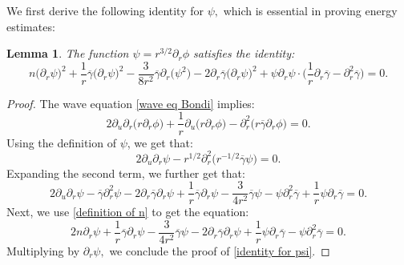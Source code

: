 \documentclass[11pt]{article}
\newtheorem{lemma}{Lemma}[section]
\numberwithin{equation}{section}
\begin{document}
We first derive the following identity for $\psi,$ which is essential in proving energy estimates:
\begin{lemma}
    The function $\psi=r^{3/2}\partial_r\phi$ satisfies the identity:
    \begin{equation}\label{identity for psi}
        n\big(\partial_r\psi\big)^2+\frac{1}{r}\overline{\gamma}\big(\partial_r\psi\big)^2-\frac{3}{8r^2}\overline{\gamma}\partial_r\big(\psi^2\big)-2\partial_r\overline{\gamma}\big(\partial_r\psi\big)^2+\psi\partial_r\psi\cdot\bigg(\frac{1}{r}\partial_r\overline{\gamma}-\partial_r^2\overline{\gamma}\bigg)=0.
    \end{equation}
\end{lemma}
\begin{proof}
    The wave equation \eqref{wave eq Bondi} implies:
\[2\partial_u\partial_r\big(r\partial_r\phi\big)+\frac{1}{r}\partial_u\big(r\partial_r\phi\big)-\partial_r^2\big(r\overline{\gamma}\partial_r\phi\big)=0.\]
Using the definition of $\psi$, we get that:
\[2\partial_u\partial_r\psi-r^{1/2}\partial_r^2\big(r^{-1/2}\overline{\gamma}\psi\big)=0.\]
Expanding the second term, we further get that:
\[2\partial_u\partial_r\psi-\overline{\gamma}\partial_r^2\psi-2\partial_r\overline{\gamma}\partial_r\psi+\frac{1}{r}\overline{\gamma}\partial_r\psi-\frac{3}{4r^2}\overline{\gamma}\psi-\psi\partial_r^2\overline{\gamma}+\frac{1}{r}\psi\partial_r\overline{\gamma}=0.\]
Next, we use \eqref{definition of n} to get the equation:
\[2n\partial_r\psi+\frac{1}{r}\overline{\gamma}\partial_r\psi-\frac{3}{4r^2}\overline{\gamma}\psi-2\partial_r\overline{\gamma}\partial_r\psi+\frac{1}{r}\psi\partial_r\overline{\gamma}-\psi\partial_r^2\overline{\gamma}=0.\]
Multiplying by $\partial_r\psi,$ we conclude the proof of \eqref{identity for psi}.
\end{proof}
\end{document}
